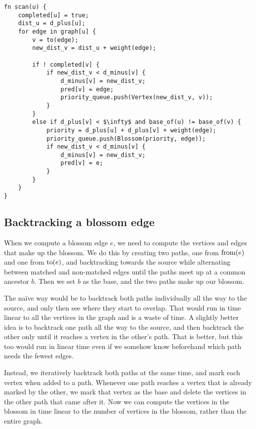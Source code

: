 \begin{lstlisting}[caption={Scan},label=Listing,mathescape=true]
fn scan(u) {
    completed[u] = true;
    dist_u = d_plus[u];
    for edge in graph[u] {
        v = to(edge);
        new_dist_v = dist_u + weight(edge);

        if ! completed[v] {
            if new_dist_v < d_minus[v] {
                d_minus[v] = new_dist_v;
                pred[v] = edge;
                priority_queue.push(Vertex(new_dist_v, v));
            }
        }
        else if d_plus[v] < $\infty$ and base_of(u) != base_of(v) {
            priority = d_plus[u] + d_plus[v] + weight(edge);
            priority_queue.push(Blossom(priority, edge));
            if new_dist_v < d_minus[v] {
                d_minus[v] = new_dist_v;
                pred[v] = e;
            }
        }
    }
}
\end{lstlisting}

\subsection{Backtracking a blossom edge}
\label{subsection:backtracking-blossom-edges}
When we compute a blossom edge $e$, we need to compute the vertices and edges that make up the blossom. We do this by creating two paths, one from $\operatorname{from}(e)$ and one from $\operatorname{to}(e)$, and backtracking towards the source while alternating between matched and non-matched edges until the paths meet up at a common ancestor $b$. Then we set $b$ as the base, and the two paths make up our blossom.

The naïve way would be to backtrack both paths individually all the way to the source, and only then see where they start to overlap. That would run in time linear to all the vertices in the graph and is a waste of time. A slightly better idea is to backtrack one path all the way to the source, and then backtrack the other only until it reaches a vertex in the other's path. That is better, but this too would run in linear time even if we somehow know beforehand which path needs the fewest edges.

Instead, we iteratively backtrack both paths at the same time, and mark each vertex when added to a path. Whenever one path reaches a vertex that is already marked by the other, we mark that vertex as the base and delete the vertices in the other path that came after it. Now we can compute the vertices in the blossom in time linear to the number of vertices in the blossom, rather than the entire graph.

